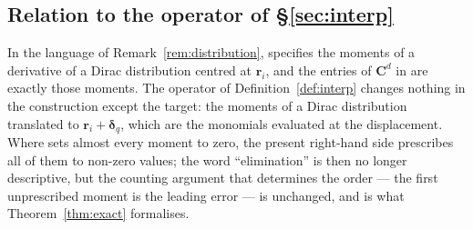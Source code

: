 \documentclass[11pt,a4paper]{article}
\begin{document}
\subsection{Relation to the operator of \texorpdfstring{\S\ref{sec:interp}}{Section 4}}

In the language of Remark~\ref{rem:distribution}, \cite[\S 3.1]{KLN2020} specifies the
moments of a derivative of a Dirac distribution centred at $\bm r_i$, and the entries of
$\bm C^{d}$ in \cite[Eq.~(5)]{KLN2020} are exactly those moments. The operator of
Definition~\ref{def:interp} changes nothing in the construction except the target: the
moments of a Dirac distribution translated to $\bm r_i+\bm\delta_q$, which are the
monomials evaluated at the displacement. Where \cite[\S 3.1]{KLN2020} sets almost every
moment to zero, the present right-hand side prescribes all of them to non-zero values;
the word ``elimination'' is then no longer descriptive, but the counting argument that
determines the order --- the first unprescribed moment is the leading error --- is
unchanged, and is what Theorem~\ref{thm:exact} formalises.
\end{document}
